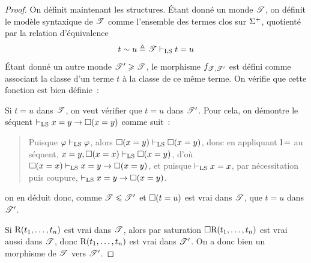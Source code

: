 \begin{proof}
  On définit maintenant les structures. \'Etant donné un monde $\mathscr T$,
  on définit le modèle syntaxique de $\mathscr T$ comme l'ensemble des
  termes clos sur $\Sigma^+$, quotienté par la relation d'équivalence
  \[t\sim u \triangleq \mathscr T \vdash_{\operatorname{LS}} t = u\]
  \'Etant donné un autre monde $\mathscr T' \geqslant \mathscr T$, le morphisme
  $f_{\mathscr T,\mathscr T'}$ est défini comme associant la classe d'un terme $t$ à la
  classe de ce même terme. On vérifie que cette fonction est bien définie~:

  Si $t = u$ dans $\mathscr T$, on veut vérifier que $t = u$ dans $\mathscr T'$.
  Pour cela, on démontre le séquent $\vdash_{\operatorname{LS}} x = y \to \mathbin{\square}(x = y)$ comme suit~:
  \begin{quotation}
    \noindent
    Puisque $\varphi\vdash_{\operatorname{LS}}\varphi$, alors
    $\mathbin{\square} (x = y) \vdash_{\operatorname{LS}} \mathbin{\square} (x = y)$, donc en appliquant $\operatorname{l}{\mathord{=}}$ au
    séquent, $x = y,\mathbin{\square}(x = x) \vdash_{\operatorname{LS}}\mathbin{\square}(x=y)$, d'où
    $\mathbin{\square}(x=x)\vdash_{\operatorname{LS}} x = y \to \mathbin{\square}(x=y)$, et puisque
    $\vdash_{\operatorname{LS}} x = x$, par nécessitation puis coupure,
    $\vdash_{\operatorname{LS}} x = y \to \mathbin{\square}(x=y)$.
  \end{quotation}
  on en déduit donc, comme $\mathscr T \leqslant \mathscr T'$ et
  $\mathbin{\square}(t = u)$ est vrai dans $\mathscr T$, que $t = u$ dans $\mathscr T'$.

  Si $\mathrm{R}(t_1,\ldots,t_n)$ est vrai dans $\mathscr T$, alors par
  saturation $\mathbin{\square} \mathrm{R}(t_1,\ldots,t_n)$ est vrai aussi dans
  $\mathscr T$, donc $\mathrm{R}(t_1,\ldots,t_n)$ est vrai dans $\mathscr T'$.
  On a donc bien un morphisme de $\mathscr T$ vers $\mathscr T'$.


\end{proof}
